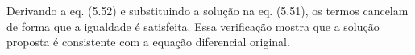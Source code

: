 Derivando a eq. (5.52) e substituindo a solução na eq. (5.51), os termos cancelam de forma que a igualdade é satisfeita. Essa verificação mostra que a solução proposta é consistente com a equação diferencial original. 